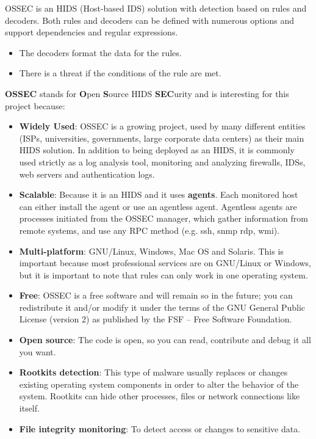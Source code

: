\linej
\linej
OSSEC is an HIDS (Host-based IDS) solution with detection based on rules and decoders. Both rules and decoders can be defined with numerous options and support dependencies and regular expressions.
\begin{itemize}
	\item The decoders format the data for the rules.
	\item There is a threat if the conditions of the rule are met.
\end{itemize}
\linej
\textbf{OSSEC} stands for \textbf{O}pen \textbf{S}ource HIDS \textbf{SEC}urity and is interesting for this project because\cite{ossec}\cite{wazuh_additional_functionality}:
\begin{itemize}
	\item \textbf{Widely Used}: OSSEC is a growing project, used by many different entities (ISPs, universities, governments, large corporate data centers) as their main HIDS solution. In addition to being deployed as an HIDS, it is commonly used strictly as a log analysis tool, monitoring and analyzing firewalls, IDSs, web servers and authentication logs.
	\item \textbf{Scalable}: Because it is an HIDS and it uses \textbf{agents}. Each monitored host can either install the agent or use an agentless agent\cite{agentless}\cite{ossec_agent}. Agentless agents are processes initiated from the OSSEC manager, which gather information from remote systems, and use any RPC method (e.g. ssh, snmp rdp, wmi).
	\item \textbf{Multi-platform}: GNU/Linux, Windows, Mac OS and Solaris. This is important because most professional services are on GNU/Linux or Windows, but it is important to note that rules can only work in one operating system.
	\item \textbf{Free}: OSSEC is a free software and will remain so in the future; you can redistribute it and/or modify it under the terms of the GNU General Public License (version 2) as published by the FSF -- Free Software Foundation.
	\item \textbf{Open source}: The code is open, so you can read, contribute and debug it all you want.
	\item \textbf{Rootkits detection}: This type of malware usually replaces or changes existing operating system components in order to alter the behavior of the system. Rootkits can hide other processes, files or network connections like itself.
	\item \textbf{File integrity monitoring}: To detect access or changes to sensitive data.
\end{itemize}
